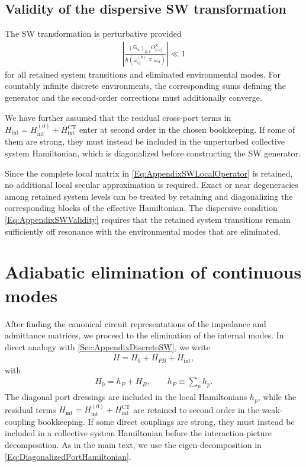 \documentclass[prx,aps,twocolumn,article]{revtex4-2}
\newcommand{\msf}[1]{\mathsf{#1}}
\newcommand{\msG}{\msf{G}}
\newcommand{\msX}{\msf{X}}
\begin{document}
\subsection{Validity of the dispersive SW transformation}

The SW transformation is perturbative provided
\begin{align}
    \left|
        \frac{
            (\msG_\alpha)_{p,\epsilon}
            O_{p,ij}^{\msX}
        }{
            \hbar
            \left(
                \omega_{ij}^{(p)}
                \mp
                \omega_\alpha
            \right)
        }
    \right|
    \ll1
\label{Eq:AppendixSWValidity}
\end{align}
for all retained system transitions and eliminated environmental modes. For countably infinite discrete environments, the corresponding sums defining the generator and the second-order corrections must additionally converge.

We have further assumed that the residual cross-port terms in $H_{\mathrm{int}}=H_{\mathrm{int}}^{(0)}+
H_{\mathrm{int}}^{\mathrm{CT}}$ enter at second order in the chosen bookkeeping. If some of them are strong,
they must instead be included in the unperturbed collective system Hamiltonian, which is diagonalized before constructing the SW generator.

Since the complete local matrix in \cref{Eq:AppendixSWLocalOperator} is
retained, no additional local secular approximation is required. Exact or near
degeneracies among retained system levels can be treated by retaining and
diagonalizing the corresponding blocks of the effective Hamiltonian. The
dispersive condition \cref{Eq:AppendixSWValidity} requires that the retained system transitions remain sufficiently off resonance with the environmental modes that are eliminated.



\section{Adiabatic elimination of continuous modes}
\label{Sec:AdiabaticElimination}

After finding the canonical circuit representations of the impedance and
admittance matrices, we proceed to the elimination of the internal modes.
In direct analogy with \cref{Sec:AppendixDiscreteSW}, we write
\begin{align}
    H
    =
    H_0
    +
    H_{PB}
    +
    H_{\mathrm{int}},
\end{align}
with
\begin{align}
    H_0
    =
    h_P+H_B,
    \qquad
    h_P
    \equiv
    \sum_p h_p.
\end{align}
The diagonal port dressings are included in the local Hamiltonians $h_p$,
while the residual terms
$H_{\mathrm{int}}=H_{\mathrm{int}}^{(0)}+
H_{\mathrm{int}}^{\mathrm{CT}}$
are retained to second order in the weak-coupling bookkeeping. If some
direct couplings are strong, they must instead be included in a collective
system Hamiltonian before the interaction-picture decomposition. As in the
main text, we use the eigen-decomposition in
\cref{Eq:DiagonalizedPortHamiltonian}.
\end{document}

